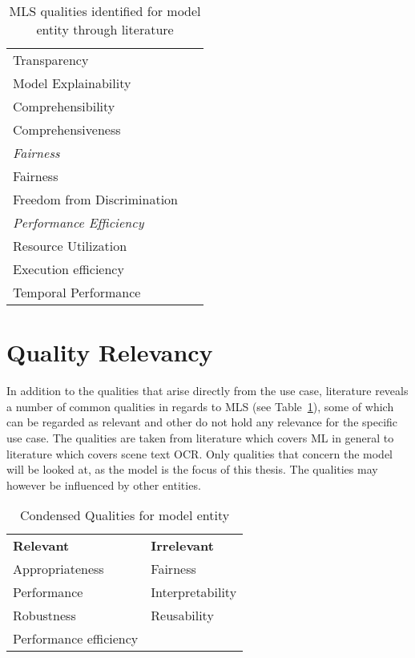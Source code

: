 \begin{table}[h]
\begin{tabular}{p{} p{}}
        Transparency &~\cite{arpteg_software_2018} \\
        Model Explainability &~\cite{vogelsang_requirements_2019} \\
        Comprehensibility &~\cite{ashmore_assuring_2021} \\
        Comprehensiveness &~\cite{ashmore_assuring_2021} \\
        \midrule
        \textit{Fairness}\\
        Fairness &~\cite{siebert_construction_2021, zhang_machine_2020} \\
        Freedom from Discrimination &~\cite{vogelsang_requirements_2019} \\
        \midrule
        \textit{Performance Efficiency} \\
        Resource Utilization &~\cite{siebert_construction_2021,
                                nakamichi_requirements-driven_2020} \\
        Execution efficiency &~\cite{siebert_construction_2021} \\
        Temporal Performance &~\cite{nakamichi_requirements-driven_2020} \\
        \bottomrule
    \end{tabular}
    \caption{\ac{MLS} qualities identified for model entity through literature}
\end{table}
\FloatBarrier

\section{Quality Relevancy}
In addition to the qualities that arise directly from the use case, literature reveals a number of
common qualities in regards to \ac{MLS} (see Table~\ref{tb:condensedQualities}), some of which
can be regarded as relevant and other do not hold any relevance for the specific use case.
The qualities are taken from literature which covers \ac{ML} in general to literature
which covers scene text \ac{OCR}.
Only qualities that concern the model will be looked at, as the model is the focus of this thesis.
The qualities may however be influenced by other entities.

\begin{table}[h]\label{tb:condensedQualities}
    \centering\scriptsize
    \begin{tabular}{l l}
        \textbf{Relevant}                & \textbf{Irrelevant} \\
        Appropriateness         & Fairness  \\
        Performance             & Interpretability \\
        Robustness              & Reusability \\
        Performance efficiency  & \\
    \end{tabular}
    \caption{Condensed Qualities for model entity}
\end{table}

